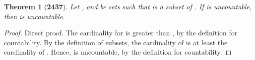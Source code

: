 \documentclass[preview]{standalone}
\newtheorem*{theorem*}{Theorem}
\begin{document}
\begin{theorem*}[\textbf{2437}]
    Let , and \bm{$\Lambda$} be sets such that 
     is a subset of \bm{$\Lambda$}. 
    If  is uncountable, 
    then \bm{$\Lambda$} is uncountable.
\end{theorem*}

\begin{proof}
    Direct proof.
    The cardinality for  is greater than ,
    by the definition for countability. 
    By the definition of subsets, 
    the cardinality of \bm{$\Lambda$} is at least the cardinality 
    of . 
    Hence, \bm{$\Lambda$} is uncountable, by the definition for countability.
\color{lightgray} \end{proof}
\end{document}
